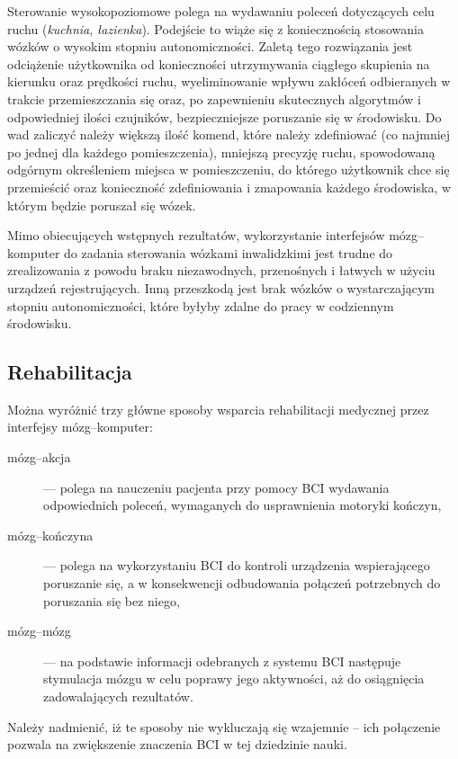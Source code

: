 \documentclass[skorowidz,skroty]{dyplomWEZUT}
\begin{document}
Sterowanie wysokopoziomowe polega na wydawaniu poleceń dotyczących celu ruchu (\textit{kuchnia}, \textit{łazienka}). Podejście to wiąże się z koniecznością stosowania wózków o wysokim stopniu autonomiczności. Zaletą tego rozwiązania jest odciążenie użytkownika od konieczności utrzymywania ciągłego skupienia na kierunku oraz prędkości ruchu, wyeliminowanie wpływu zakłóceń odbieranych w trakcie przemieszczania się oraz, po zapewnieniu skutecznych algorytmów i odpowiedniej ilości czujników, bezpieczniejsze poruszanie się w środowisku. Do wad zaliczyć należy większą ilość komend, które należy zdefiniować (co najmniej po jednej dla każdego pomieszczenia), mniejszą precyzję ruchu, spowodowaną odgórnym określeniem miejsca w pomieszczeniu, do którego użytkownik chce się przemieścić oraz konieczność zdefiniowania i zmapowania każdego środowiska, w którym będzie poruszał się wózek.

Mimo obiecujących wstępnych rezultatów, wykorzystanie interfejsów mózg--kom\-pu\-ter do zadania sterowania wózkami inwalidzkimi jest trudne do zrealizowania z powodu braku niezawodnych, przenośnych i łatwych w użyciu urządzeń rejestrujących. Inną przeszkodą jest brak wózków o wystarczającym stopniu autonomiczności, które byłyby zdalne do pracy w codziennym środowisku\cite{bci_introduction}.

\subsection{Rehabilitacja}
Można wyróżnić trzy główne sposoby wsparcia rehabilitacji medycznej przez interfejsy mózg--komputer\cite{bci_lab}:
\begin{description}
    \item [mózg--akcja] --- polega na nauczeniu pacjenta przy pomocy BCI wydawania odpowiednich poleceń, wymaganych do usprawnienia motoryki kończyn,
    \item [mózg--kończyna] --- polega na wykorzystaniu BCI do kontroli urządzenia wspierającego poruszanie się, a w konsekwencji odbudowania połączeń potrzebnych do poruszania się bez niego,
    \item [mózg--mózg] --- na podstawie informacji odebranych z systemu BCI następuje stymulacja mózgu w celu poprawy jego aktywności, aż do osiągnięcia zadowalających rezultatów.
\end{description}
Należy nadmienić, iż te sposoby nie wykluczają się wzajemnie -- ich połączenie pozwala na zwiększenie znaczenia BCI w tej dziedzinie nauki.
\end{document}
